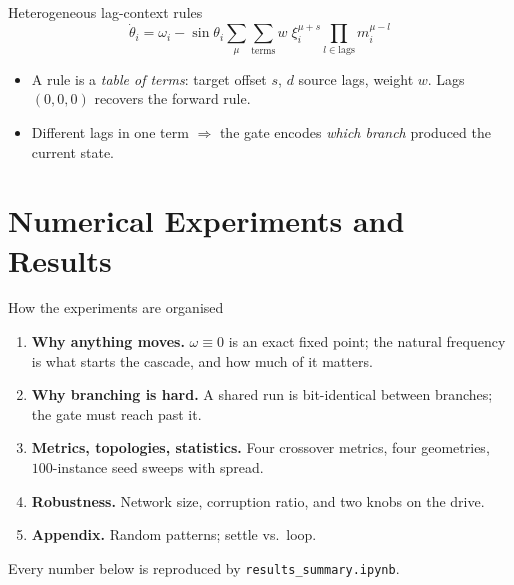 \documentclass[aspectratio=169]{beamer}
\newcommand{\xxi}{\xi}
\newcommand{\thetavar}{\theta}
\newcommand{\mvar}{m}
\begin{document}
\begin{frame}{Heterogeneous lag-context rules}
  \[
    \dot\thetavar_i = \omega_i - \sin\thetavar_i \sum_{\mu}\sum_{\text{terms}}
      w \;\xxi_i^{\mu+s} \prod_{l \in \text{lags}} \mvar_i^{\mu - l}
  \]
  \begin{itemize}
    \item A rule is a \emph{table of terms}: target offset $s$, $d$ source
      lags, weight $w$. Lags $(0,0,0)$ recovers the forward rule.
    \item Different lags in one term $\Rightarrow$ the gate encodes
      \emph{which branch} produced the current state.
  \end{itemize}
\end{frame}


\section[Results]{Numerical Experiments and Results}

\begin{frame}{How the experiments are organised}
  \begin{enumerate}
    \item \textbf{Why anything moves.} $\omega \equiv 0$ is an exact fixed point;
      the natural frequency is what starts the cascade, and how much of it matters.
    \item \textbf{Why branching is hard.} A shared run is bit-identical between
      branches; the gate must reach past it.
    \item \textbf{Metrics, topologies, statistics.} Four crossover metrics, four
      geometries, $100$-instance seed sweeps with spread.
    \item \textbf{Robustness.} Network size, corruption ratio, and two knobs on the drive.
    \item \textbf{Appendix.} Random patterns; settle vs.\ loop.
  \end{enumerate}
  \vspace{2mm}
  {\small Every number below is reproduced by \texttt{results\_summary.ipynb}.}
\end{frame}
\end{document}
